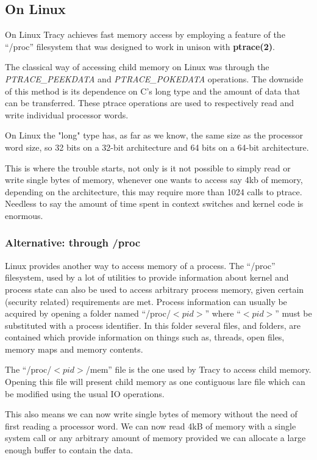 \documentclass[a4paper, twoside, 10pt, twocolumn]{report}
\begin{document}
\subsection{On Linux}
On Linux Tracy achieves fast memory access by employing a feature of the
``/proc'' filesystem that was designed to work in unison with
\textbf{ptrace(2)}.

The classical way of accessing child memory on Linux was through the
\textit{PTRACE\_PEEKDATA} and \textit{PTRACE\_POKEDATA} operations.
The downside of this method is its dependence on C's long type and the
amount of data that can be transferred.
These ptrace operations are used to respectively read and write individual
processor words.

On Linux the "long" type has, as far as we know, the same size as the
processor word size, so 32 bits on a 32-bit architecture and
64 bits on a 64-bit architecture.

This is where the trouble starts, not only is it not possible to simply read
or write single bytes of memory, whenever one wants to access say 4kb of
memory, depending on the architecture, this may require more than 1024
calls to ptrace. Needless to say the amount of time spent in context switches
and kernel code is enormous.

\subsubsection{Alternative: through /proc}
Linux provides another way to access memory of a process. The ``/proc''
filesystem, used by a lot of utilities to provide information about kernel
and process state can also be used to access arbitrary process memory,
given certain (security related) requirements are met.
Process information can usually be acquired by opening a folder
named ``/proc/$<pid>$'' where ``$<pid>$'' must be substituted with a process
identifier. In this folder several files, and folders, are contained which
provide information on things such as, threads, open files, memory maps and
memory contents.

The ``/proc/$<pid>$/mem'' file is the one used by Tracy to access child memory.
Opening this file will present child memory as one contiguous lare file which
can be modified using the usual IO operations.

This also means we can now write single bytes of memory without the need
of first reading a processor word. We can now read 4kB of memory with a
single system call or any arbitrary amount of memory provided we can allocate
a large enough buffer to contain the data.
\end{document}
